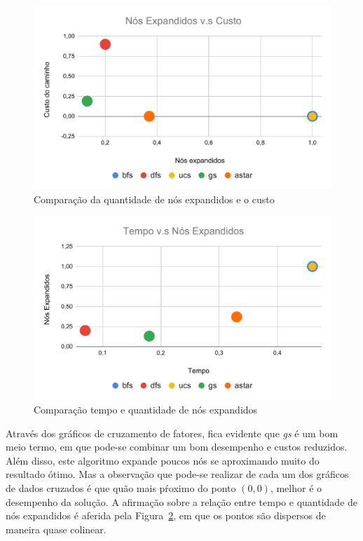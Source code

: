 \documentclass[12pt]{article}
\begin{document}
\begin{figure}[hbt!]
  \centering
  \includegraphics[width=.8\textwidth]{fig/expansao-custo.pdf}
  \caption{Comparação da quantidade de nós expandidos e o custo}
  \label{fig:expansao-custo}
\end{figure}

\begin{figure}[hbt!]
  \centering
  \includegraphics[width=.8\textwidth]{fig/tempo-expansao.pdf}
  \caption{Comparação tempo e quantidade de nós expandidos}
  \label{fig:tempo-expansao}
\end{figure}

Através dos gráficos de cruzamento de fatores, fica evidente que \textit{gs} é
um bom meio termo, em que pode-se combinar um bom desempenho e custos reduzidos.
Além disso, este algoritmo expande poucos nós se aproximando muito do resultado
ótimo.
Mas a observação que pode-se realizar de cada um dos gráficos de dados cruzados
é que quão mais pŕoximo do ponto $(0,0)$, melhor é o desempenho da solução.
A afirmação sobre a relação entre tempo e quantidade de nós expandidos é aferida
pela Figura~\ref{fig:tempo-expansao}, em que os pontos são dispersos de maneira
quase colinear.
\end{document}
